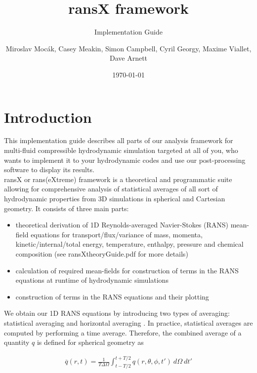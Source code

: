 \documentclass[11pt,paper=a4]{report}
\title{{\bf ransX framework}}
\subtitle{Implementation Guide}
\author{
        Miroslav Moc\'ak, Casey Meakin, Simon Campbell, Cyril Georgy, Maxime Viallet, Dave Arnett
}
\date{\today}
\newcommand{\eht}{\overline}
\begin{document}

\maketitle

\tableofcontents

\newpage

\section{Introduction}

This implementation guide describes all parts of our analysis framework for multi-fluid compressible hydrodynamic simulation targeted at all of you, who wants to implement it to your hydrodynamic codes and use our post-processing software to display its results.\\

ransX or rans(eXtreme) framework is a theoretical and programmatic suite allowing for comprehensive analysis of statistical averages of all sort of hydrodynamic properties from 3D simulations in spherical and Cartesian geometry. It consists of three main parts:

\begin{itemize}
\item theoretical derivation of 1D Reynolds-averaged Navier-Stokes (RANS) mean-field equations for transport/flux/variance of mass, momenta, kinetic/internal/total energy, temperature, enthalpy, pressure and chemical composition (see ransXtheoryGuide.pdf for more details)
\item calculation of required mean-fields for construction of terms in the RANS equations at runtime of hydrodynamic simulations
\item construction of terms in the RANS equations and their plotting  
\end{itemize}

\par We obtain our 1D RANS equations by introducing two types of averaging:  statistical averaging and  horizontal averaging \citep{Besnard1992,VialletMeakin2013}. In practice, statistical averages are computed by performing a time average. Therefore, the combined average of a quantity $q$ is defined for spherical geometry as

\begin{align}\label{eq:eht}
\eht{q}(r,t) = \frac{1}{T\Delta\Omega}\int_{t- T/2}^{t+T/2} q(r,\theta,\phi,t')~d\Omega~dt'
\end{align}
\end{document}
